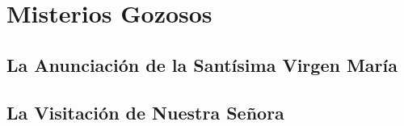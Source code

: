 \documentclass[a4paper,11pt]{article}
\begin{document}
  \section*{\hfil Misterios Gozosos \hfil}
    \subsection*{\hfil La Anunciación de la Santísima Virgen María \hfil}

      
      \medskip

      
      \medskip

      
      \medskip

      
      \medskip

      
      \medskip

      
      \medskip

      
      \medskip
      
      
      \medskip

      
      \medskip

      
      \medskip
            
    \subsection*{\hfil La Visitación de Nuestra Señora \hfil}
      
      
      \medskip
      
      
      \medskip
      
      
      \medskip
      
      
      \medskip
      
      
      \medskip

      
      \medskip
      
\end{document}
